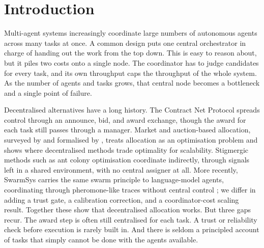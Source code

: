 \documentclass[11pt]{article}
\begin{document}
\begin{abstract}
deterministic and reproduced from seeds by one command, and the real-agent results are powered (about ten agents per cell for the ladder, five for the project) with bootstrap confidence intervals.
\end{abstract}

\section{Introduction}

Multi-agent systems increasingly coordinate large numbers of autonomous agents across many tasks at once. A common design puts one central orchestrator in charge of handing out the work from the top down. This is easy to reason about, but it piles two costs onto a single node. The coordinator has to judge candidates for every task, and its own throughput caps the throughput of the whole system. As the number of agents and tasks grows, that central node becomes a bottleneck and a single point of failure.

Decentralised alternatives have a long history. The Contract Net Protocol \citep{smith1980contractnet} spreads control through an announce, bid, and award exchange, though the award for each task still passes through a manager. Market and auction-based allocation, surveyed by \citet{dias2006market} and formalised by \citet{gerkey2004taxonomy}, treats allocation as an optimisation problem and shows where decentralised methods trade optimality for scalability. Stigmergic methods such as ant colony optimisation \citep{dorigo1996ant} coordinate indirectly, through signals left in a shared environment, with no central assigner at all. More recently, SwarmSys carries the same swarm principle to language-model agents, coordinating through pheromone-like traces without central control \citep{li2025swarmsys}; we differ in adding a trust gate, a calibration correction, and a coordinator-cost scaling result. Together these show that decentralised allocation works. But three gaps recur. The award step is often still centralised for each task. A trust or reliability check before execution is rarely built in. And there is seldom a principled account of tasks that simply cannot be done with the agents available.
\end{document}
